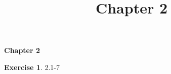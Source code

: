 \documentclass[14pt]{article}
\theoremstyle{definition}
\newtheorem*{exercise}{Exercise}
\theoremstyle{remark}
\numberwithin{equation}{section}
\numberwithin{theorem}{section}
\begin{document}
\setcounter{section}{0}
\title{Chapter 2}

\thispagestyle{empty}
\begin{center}
{\LARGE \bf Chapter 2}
\end{center}

\begin{exercise}{2.1-7}

\end{exercise}
\end{document}
